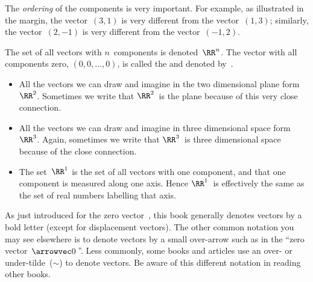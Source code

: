 The \emph{ordering} of the components is very important.
%
For example, as illustrated in the margin, the vector~\((3,1)\) is very different from the vector~\((1,3)\); similarly, the vector~\((2,-1)\) is very different from the vector~\((-1,2)\).
 


\begin{definition} \label{def:}
The set of all vectors with \(n\)~components is denoted~\(\RR^n\).
The vector with all components zero,  \((0,0,\ldots,0)\), is called the  and denoted by~\ov.
\end{definition}

\begin{example} \label{eg:}
\begin{itemize}
\item All the vectors we can draw and imagine in the two dimensional plane form~\(\RR^2\).  Sometimes we write that \(\RR^2\)~is the plane because of this very close connection.

\item All the vectors we can draw and imagine in three dimensional space form~\(\RR^3\).  Again, sometimes we write that \(\RR^3\)~is three dimensional space because of the close connection. 

\item The set~\(\RR^1\) is the set of all vectors with one component, and that one component is measured along one axis.  Hence \(\RR^1\)~is effectively the same as the set of real numbers labelling that axis.
\end{itemize}
\end{example}


As just introduced for the zero vector~\ov, this book generally denotes vectors by a bold letter (except for displacement vectors).
The other common notation you may see elsewhere is to denote vectors by a small over-arrow such as in the ``zero vector~\(\arrowvec0\)\,''.
Less commonly, some books and articles use an over- or under-tilde~(\(\sim\)) to denote vectors.
Be aware of this different notation in reading other books.



